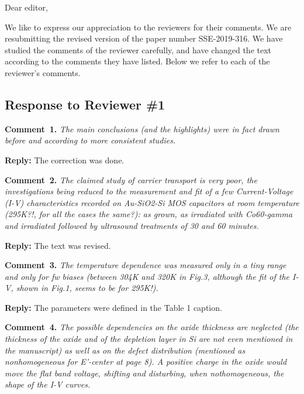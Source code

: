 \documentclass[aip,jap,preprint]{revtex4-1}
\begin{document}
Dear editor,

We like to express our appreciation to the reviewers for their comments.
We are resubmitting the revised version of the paper number  SSE-2019-316.
We have studied the comments of the reviewer carefully, and have changed the text according to the comments they
have listed.
Below we refer to each of the reviewer’s comments.



\subsection*{Response to Reviewer \#1 }

\noindent
\textcolor[rgb]{0.00,0.50,1.00}{\textbf{Comment~1.}}
\emph{The main conclusions (and the highlights) were in fact drawn before and according to more consistent studies.}

\noindent
\textcolor[rgb]{0.51,0.00,0.00}{\textbf{Reply:}}
The correction was done.



\noindent
\textcolor[rgb]{0.00,0.50,1.00}{\textbf{Comment~2.}}
\emph{The claimed study of carrier transport is very poor, the investigations being reduced to the measurement and fit of a few Current-Voltage (I-V) characteristics recorded on Au-SiO2-Si MOS capacitors at room temperature (295K?!, for all the cases the same?): as grown, as irradiated with Co60-gamma and irradiated followed by ultrasound treatments of 30 and 60 minutes.}

\noindent
\textcolor[rgb]{0.51,0.00,0.00}{\textbf{Reply:}}
The text was revised.



\noindent
\textcolor[rgb]{0.00,0.50,1.00}{\textbf{Comment~3.}}
\emph{The temperature dependence was measured only in a tiny range and only for fw biases (between 304K and 320K in Fig.3, although the fit of the I-V, shown in Fig.1, seems to be for 295K!).}


\noindent
\textcolor[rgb]{0.51,0.00,0.00}{\textbf{Reply:}}
The parameters were defined in the Table 1 caption.



\noindent
\textcolor[rgb]{0.00,0.50,1.00}{\textbf{Comment~4.}}
\emph{The possible dependencies on the oxide thickness are neglected (the thickness of the oxide and of the depletion layer in Si are not even mentioned in the manuscript) as well as on the defect distribution (mentioned as nonhomogeneous for E’-center at page 8). A positive charge in the oxide would move the flat band voltage, shifting and disturbing, when nothomogeneous, the shape of the I-V curves.}
\end{document}
